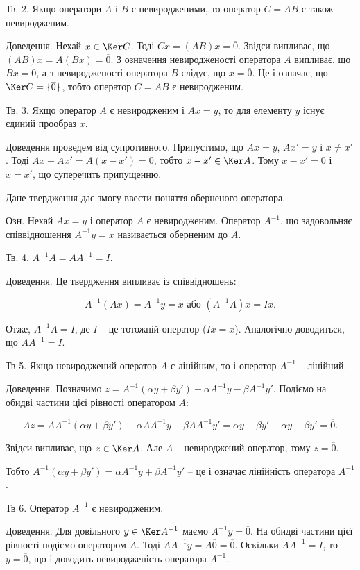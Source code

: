 Тв. 2. Якщо оператори $A$ і $B$ є невиродженими, то оператор $C = A B$ є також
невиродженим.

Доведення. Нехай $x \in \Ker C$. Тоді $C x = (A B)x = \overline{0}$. Звідси випливає, що
$(AB)x = A(Bx) = \overline{0}$. З означення невиродженості оператора $A$ випливає, що
$B x = 0$, а з невиродженості оператора $B$ слідує, що $x = \overline{0}$. Це і означає, що
$\Ker C = \{\overline{0}\}$, тобто оператор $C = A B$ є невиродженим.


Тв. 3. Якщо оператор $A$ є невиродженим і $A x = y$, то для елементу $y$ існує
єдиний прообраз $x$.

Доведення проведем від супротивного. Припустимо, що $A x = y$, $A x' = y$ і
$x \neq x'$. Тоді $Ax - Ax' = A(x - x') = 0$, тобто $x - x' \in \Ker A$. Тому $x - x' = \overline{0}$ і
$x = x'$, що суперечить припущенню.

Дане твердження дає змогу ввести поняття оберненого оператора. 

Озн. Нехай $A x = y$ і оператор $A$ є невиродженим. Оператор $A^{-1}$, що
задовольняє співвідношення $A^{-1} y = x$ називається оберненим до $A$.

Тв. 4. $A^{-1}A = A A^{-1} = I$.

Доведення. Це твердження випливає із співвідношень:

$$A^{-1}(Ax) = A^{-1}y = x \text{ або } (A^{-1}A)x = Ix.$$

Отже, $A^{-1}A = I$, де $I$ -- це тотожній оператор ($Ix = x$). Аналогічно доводиться, що
$AA^{-1} = I$.


Тв 5. Якщо невироджений оператор $A$ є лінійним, то і оператор $A^{-1}$ -- лінійний.


Доведення. Позначимо $z = A^{-1}(\alpha y + \beta y') - \alpha A^{-1} y - \beta A^{-1} y'$. Подіємо на
обидві частини цієї рівності оператором $A$:

$$Az = AA^{-1}(\alpha y + \beta y') - \alpha A A^{-1} y - \beta A A^{-1} y' = \alpha y + \beta y' - \alpha y - \beta y' = \overline{0}.$$

Звідси випливає, що $z \in \Ker A$. Але $A$ -- невироджений оператор, тому $z = \overline{0}$.

Тобто $A^{-1}(\alpha y + \beta y') = \alpha A^{-1} y + \beta A^{-1} y'$ -- це і означає лінійність оператора $A^{-1}$.


Тв 6. Оператор $A^{-1}$ є невиродженим.

Доведення. Для довільного $y \in \Ker A^{-1}$ маємо $A^{-1} y = \overline{0}$. На обидві частини
цієї рівності подіємо оператором $A$. Тоді $A A^{-1} y = A \overline{0} = \overline{0}$. Оскільки
$A A^{-1} = I$, то $y = \overline{0}$, що і доводить невиродженість оператора $A^{-1}$.


